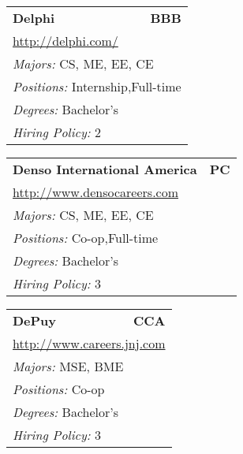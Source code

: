 \documentclass[twoside]{article}
\begin{document}
\begin{center}
\begin{multicols}{3}
\begin{FlushLeft}
\begin{minipage}{\columnwidth}
\end{minipage}
 
\begin{minipage}{\columnwidth}\begin{tabularx}{.95\columnwidth}{Xr}
                 {\Large\bf Delphi} & {\Large\bf BBB}\\
    \multicolumn{2}{p{.95\columnwidth}}{\url{http://delphi.com/}}\\
    \multicolumn{2}{p{.95\columnwidth}}{\emph{Majors:} CS, ME, EE, CE}\\
    \multicolumn{2}{p{.95\columnwidth}}{\emph{Positions:} Internship,Full-time}\\
    \multicolumn{2}{p{.95\columnwidth}}{\emph{Degrees:} Bachelor's}\\
    \multicolumn{2}{p{.95\columnwidth}}{\emph{Hiring Policy:} 2}\\
    \end{tabularx}
    
\end{minipage}
 
\begin{minipage}{\columnwidth}\begin{tabularx}{.95\columnwidth}{Xr}
                 {\Large\bf Denso International America} & {\Large\bf PC}\\
    \multicolumn{2}{p{.95\columnwidth}}{\url{http://www.densocareers.com}}\\
    \multicolumn{2}{p{.95\columnwidth}}{\emph{Majors:} CS, ME, EE, CE}\\
    \multicolumn{2}{p{.95\columnwidth}}{\emph{Positions:} Co-op,Full-time}\\
    \multicolumn{2}{p{.95\columnwidth}}{\emph{Degrees:} Bachelor's}\\
    \multicolumn{2}{p{.95\columnwidth}}{\emph{Hiring Policy:} 3}\\
    \end{tabularx}
    
\end{minipage}
 
\begin{minipage}{\columnwidth}\begin{tabularx}{.95\columnwidth}{Xr}
                 {\Large\bf DePuy} & {\Large\bf CCA}\\
    \multicolumn{2}{p{.95\columnwidth}}{\url{http://www.careers.jnj.com}}\\
    \multicolumn{2}{p{.95\columnwidth}}{\emph{Majors:} MSE, BME}\\
    \multicolumn{2}{p{.95\columnwidth}}{\emph{Positions:} Co-op}\\
    \multicolumn{2}{p{.95\columnwidth}}{\emph{Degrees:} Bachelor's}\\
    \multicolumn{2}{p{.95\columnwidth}}{\emph{Hiring Policy:} 3}\\
    \end{tabularx}
    

\end{minipage}
\end{FlushLeft}
\end{multicols}
\end{center}
\end{document}

